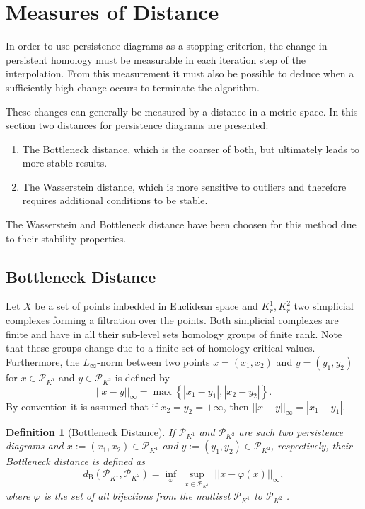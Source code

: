 \documentclass[journal]{IEEEtran}
\newtheorem{definition}{Definition}[section]
\begin{document}
\section{Measures of Distance}
\label{sec:distances}
In order to use persistence diagrams as a stopping-criterion, the change in persistent homology must be measurable in each iteration step of the interpolation. From this measurement it must also be possible to deduce when a sufficiently high change occurs to terminate the algorithm.

These changes can generally be measured by a distance in a metric space. In this section two distances for persistence diagrams are presented:

\begin{enumerate}
\item The Bottleneck distance, which is the coarser of both, but ultimately leads to more stable results.
\item The Wasserstein distance, which is more sensitive to outliers and therefore requires additional conditions to be stable.
\end{enumerate}

The Wasserstein and Bottleneck distance have been choosen for this method due to their stability properties.

\subsection{Bottleneck Distance}
Let $X$ be a set of points imbedded in Euclidean space and $K_{r}^1, K_{r}^2$ two simplicial complexes forming a filtration over the points. Both simplicial complexes are finite and have in all their sub-level sets homology groups of finite rank. Note that these groups change due to a finite set of homology-critical values. Furthermore, the $L_\infty$-norm between two points $x = (x_1,x_2)$ and $y = (y_1,y_2)$ for $x \in \mathcal{P}_{K^1}$ and $y \in \mathcal{P}_{K^2}$ is defined by
\begin{equation}
||x-y||_\infty = \max\left\{|x_1-y_1|,|x_2-y_2|\right\}.
\end{equation}
By convention it is assumed that if $x_2=y_2=+\infty$, then $||x-y||_\infty = |x_1-y_1|$.

\begin{definition}[Bottleneck Distance]
If $\mathcal{P}_{K^1}$ and $\mathcal{P}_{K^2}$ are such two persistence diagrams and $x:=(x_1,x_2) \in \mathcal{P}_{K^1}$ and $y := (y_1,y_2)\in \mathcal{P}_{K^2}$, respectively, their Bottleneck distance is defined as
\begin{equation}
d_\text{B}(\mathcal{P}_{K^1},\mathcal{P}_{K^2})=\inf_{\varphi} \; \sup_{x\in \mathcal{P}_{K^1}}\;||x-\varphi(x)||_\infty,
\end{equation}
where $\varphi$ is the set of all bijections from the multiset $\mathcal{P}_{K^1}$ to $\mathcal{P}_{K^2}$ \cite{boissonnat2018geometric, edelsbrunner2008persistent}.
\end{definition}
\end{document}

